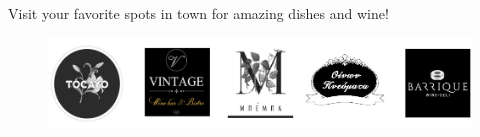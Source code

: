 \begin{MyAd}[enhanced, tikz={rotate=0},  width=0.25\textwidth]{}%
  Visit your favorite spots in town for amazing dishes and wine!
  \begin{figure}
    \begin{center}
      \vspace{-0.5cm}
      \includegraphics[width=1.0\textwidth]{./figures/restaurants.png}
    \end{center}
  \end{figure}
  \vspace{-0.5cm}
\end{MyAd}
